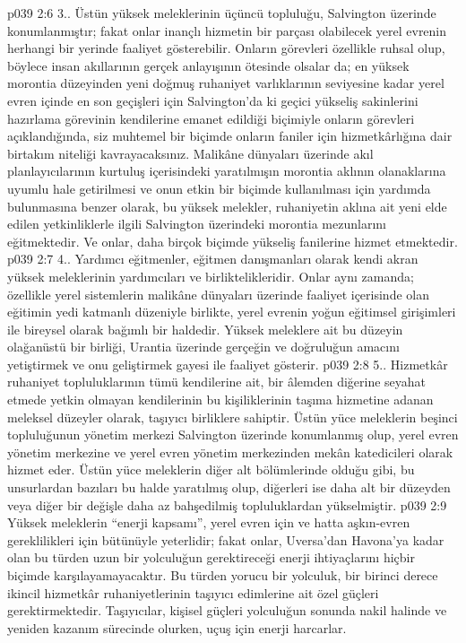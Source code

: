 \vs p039 2:6 3.\bibnobreakspace {}. Üstün yüksek meleklerinin üçüncü topluluğu, Salvington üzerinde konumlanmıştır; fakat onlar inançlı hizmetin bir parçası olabilecek yerel evrenin herhangi bir yerinde faaliyet gösterebilir. Onların görevleri özellikle ruhsal olup, böylece insan akıllarının gerçek anlayışının ötesinde olsalar da; en yüksek morontia düzeyinden yeni doğmuş ruhaniyet varlıklarının seviyesine kadar yerel evren içinde en son geçişleri için Salvington’da ki geçici yükseliş sakinlerini hazırlama görevinin kendilerine emanet edildiği biçimiyle onların görevleri açıklandığında, siz muhtemel bir biçimde onların faniler için hizmetkârlığına dair birtakım niteliği kavrayacaksınız. Malikâne dünyaları üzerinde akıl planlayıcılarının kurtuluş içerisindeki yaratılmışın morontia aklının olanaklarına uyumlu hale getirilmesi ve onun etkin bir biçimde kullanılması için yardımda bulunmasına benzer olarak, bu yüksek melekler, ruhaniyetin aklına ait yeni elde edilen yetkinliklerle ilgili Salvington üzerindeki morontia mezunlarını eğitmektedir. Ve onlar, daha birçok biçimde yükseliş fanilerine hizmet etmektedir.
\vs p039 2:7 4.\bibnobreakspace {}. Yardımcı eğitmenler, eğitmen danışmanları olarak kendi akran yüksek meleklerinin yardımcıları ve birliktelikleridir. Onlar aynı zamanda; özellikle yerel sistemlerin malikâne dünyaları üzerinde faaliyet içerisinde olan eğitimin yedi katmanlı düzeniyle birlikte, yerel evrenin yoğun eğitimsel girişimleri ile bireysel olarak bağımlı bir haldedir. Yüksek meleklere ait bu düzeyin olağanüstü bir birliği, Urantia üzerinde gerçeğin ve doğruluğun amacını yetiştirmek ve onu geliştirmek gayesi ile faaliyet gösterir.
\vs p039 2:8 5.\bibnobreakspace {}. Hizmetkâr ruhaniyet topluluklarının tümü kendilerine ait, bir âlemden diğerine seyahat etmede yetkin olmayan kendilerinin bu kişiliklerinin taşıma hizmetine adanan meleksel düzeyler olarak, taşıyıcı birliklere sahiptir. Üstün yüce meleklerin beşinci topluluğunun yönetim merkezi Salvington üzerinde konumlanmış olup, yerel evren yönetim merkezine ve yerel evren yönetim merkezinden mekân katedicileri olarak hizmet eder. Üstün yüce meleklerin diğer alt bölümlerinde olduğu gibi, bu unsurlardan bazıları bu halde yaratılmış olup, diğerleri ise daha alt bir düzeyden veya diğer bir değişle daha az bahşedilmiş topluluklardan yükselmiştir.
\vs p039 2:9 Yüksek meleklerin “enerji kapsamı”, yerel evren için ve hatta aşkın\hyp{}evren gereklilikleri için bütünüyle yeterlidir; fakat onlar, Uversa’dan Havona’ya kadar olan bu türden uzun bir yolculuğun gerektireceği enerji ihtiyaçlarını hiçbir biçimde karşılayamayacaktır. Bu türden yorucu bir yolculuk, bir birinci derece ikincil hizmetkâr ruhaniyetlerinin taşıyıcı edimlerine ait özel güçleri gerektirmektedir. Taşıyıcılar, kişisel güçleri yolculuğun sonunda nakil halinde ve yeniden kazanım sürecinde olurken, uçuş için enerji harcarlar.

